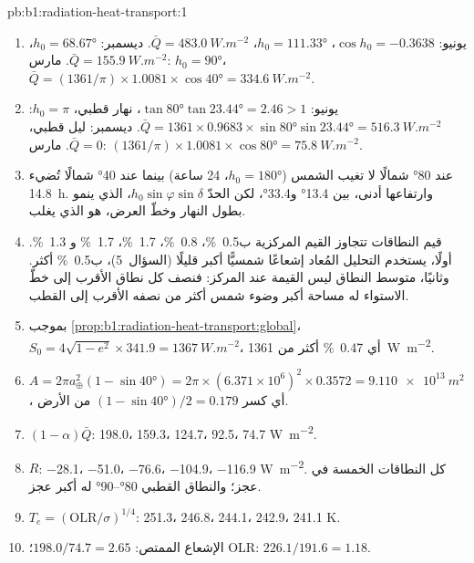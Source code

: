 \begin{solution}{pb:b1:radiation-heat-transport:1}
\begin{enumerate}
  \item يونيو: $\cos h_0 = -0.3638$، $h_0 = \ang{111.33}$، $\bar Q =
        \qty{483.0}{W.m^{-2}}$. ديسمبر: $h_0 = \ang{68.67}$، $\bar Q =
        \qty{155.9}{W.m^{-2}}$. مارس: $h_0 = \ang{90}$، $\bar Q = (1361/\pi)
        \times 1.0081 \times \cos\ang{40} = \qty{334.6}{W.m^{-2}}$.
  \item يونيو: $\tan\ang{80}\tan\ang{23.44} = 2.46 > 1$، نهار قطبي، $h_0 = \pi$:
        $\bar Q = 1361 \times 0.9683 \times \sin\ang{80}\sin\ang{23.44} =
        \qty{516.3}{W.m^{-2}}$. ديسمبر: ليل قطبي، $\bar Q = 0$. مارس:
        $(1361/\pi) \times 1.0081 \times \cos\ang{80} = \qty{75.8}{W.m^{-2}}$.
  \item عند \ang{80} شمالًا لا تغيب الشمس ($h_0 = \ang{180}$، 24 ساعة) بينما عند
        \ang{40} شمالًا تُضيء \qty{14.8}{h}. وارتفاعها أدنى، بين
        \ang{13.4} و\ang{33.4}، لكن الحدّ $h_0\sin\varphi\sin\delta$، الذي ينمو بطول النهار وخطّ العرض، هو الذي يغلب.
  \item قيم النطاقات تتجاوز القيم المركزية ب\qty{0.5}{\percent}،
        \qty{0.8}{\percent}، \qty{1.7}{\percent}، \qty{1.7}{\percent} و
        \qty{1.3}{\percent}. أولًا، يستخدم التحليل المُعاد إشعاعًا شمسيًّا أكبر قليلًا (السؤال~5)، ب\qty{0.5}{\percent} أكثر. وثانيًا، متوسط النطاق ليس القيمة عند المركز: فنصف كل نطاق الأقرب إلى خطّ الاستواء له مساحة أكبر وضوء شمس أكثر من نصفه الأقرب إلى القطب.
  \item بموجب \cref{prop:b1:radiation-heat-transport:global}، $S_0 = 4\sqrt{1-e^2}
        \times 341.9 = \qty{1367}{W.m^{-2}}$، أي \qty{0.47}{\percent} أكثر من \qty{1361}{W.m^{-2}}.
  \item $A = 2\pi a_\oplus^2(1 - \sin\ang{40}) = 2\pi \times (6.371\times10^6)^2
        \times 0.3572 = \qty{9.110e13}{m^2}$، أي كسر $(1 - \sin\ang{40})/2 =
        0.179$ من الأرض.
  \item $(1 - \alpha)\bar Q$: \num{198.0}، \num{159.3}، \num{124.7}، \num{92.5}،
        \num{74.7} \unit{W.m^{-2}}.
  \item $R$: \num{-28.1}، \num{-51.0}، \num{-76.6}، \num{-104.9}، \num{-116.9}
        \unit{W.m^{-2}}. كل النطاقات الخمسة في عجز؛ والنطاق القطبي
        \ang{80}--\ang{90} له أكبر عجز.
  \item $T_e = (\text{OLR}/\sigma)^{1/4}$: \num{251.3}، \num{246.8}، \num{244.1}،
        \num{242.9}، \num{241.1} \unit{K}.
  \item الإشعاع الممتص: $198.0/74.7 = 2.65$؛ OLR: $226.1/191.6 = 1.18$.

\end{enumerate}
\end{solution}
